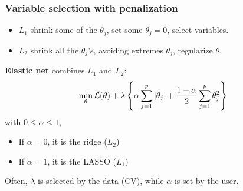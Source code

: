\begin{frame}
\frametitle{Variable selection with penalization}
\begin{itemize}
\item $L_1$ shrink some of the $\theta_j$, set some $\theta_j = 0$, select variables.
\item $L_2$ shrink all the $\theta_j$'s, avoiding extremes $\theta_j$, regularize $\theta$. 
\end{itemize}
{\bf Elastic net} combines $L_1$ and $L_2$:
$$
\displaystyle \min_\theta \bar{\cal L}(\theta) + \lambda \left\{\alpha \sum_{j=1}^p \vert \theta_j  \vert + \frac{1-\alpha}{2}\sum_{j=1}^p \theta_j^2\right\}
$$
with $0 \leq \alpha \leq 1$,
\begin{itemize}
\item If $\alpha=0$, it is the ridge ($L_2$)
\item If $\alpha=1$, it is the LASSO ($L_1$)
\end{itemize}
Often, $\lambda$ is selected by the data (CV), while $\alpha$ is set by the user.
\end{frame}



